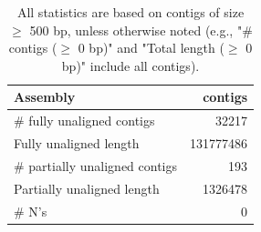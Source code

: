 \documentclass[12pt,a4paper]{article}
\begin{document}
\begin{table}[ht]
\begin{center}
\caption{All statistics are based on contigs of size $\geq$ 500 bp, unless otherwise noted (e.g., "\# contigs ($\geq$ 0 bp)" and "Total length ($\geq$ 0 bp)" include all contigs).}
\begin{tabular}{|l*{1}{|r}|}
\hline
Assembly & contigs \\ \hline
\# fully unaligned contigs & 32217 \\ \hline
Fully unaligned length & 131777486 \\ \hline
\# partially unaligned contigs & 193 \\ \hline
Partially unaligned length & 1326478 \\ \hline
\# N's & 0 \\ \hline
\end{tabular}
\end{center}
\end{table}
\end{document}
